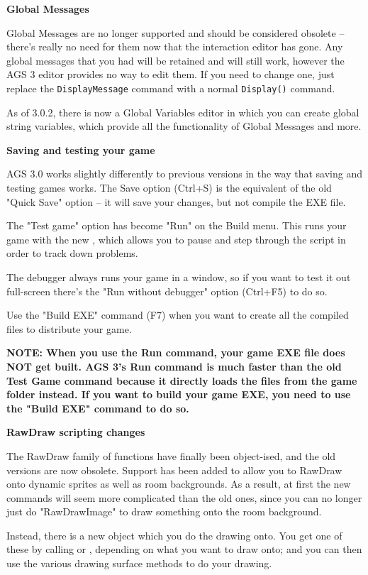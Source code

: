\bf{Global Messages}

Global Messages are no longer supported and should be considered obsolete --
there's really no need for them now that the interaction editor has gone.
Any global messages that you had will be retained and will still work,
however the AGS 3 editor provides no way to edit them. If you need to change
one, just replace the \verb$DisplayMessage$ command with a normal \verb$Display()$
command.

As of 3.0.2, there is now a Global Variables editor in which you can create global
string variables, which provide all the functionality of Global Messages and more.

\bf{Saving and testing your game}

AGS 3.0 works slightly differently to previous versions in the way that saving
and testing games works. The Save option (Ctrl+S) is the equivalent of the old
"Quick Save" option -- it will save your changes, but not compile the EXE file.

The "Test game" option has become "Run" on the Build menu. This runs your game
with the new , which allows you to pause
and step through the script in order to track down problems.

The debugger always runs your game in a window, so if you want to test it out
full-screen there's the "Run without debugger" option (Ctrl+F5) to do so.

Use the "Build EXE" command (F7) when you want to create all the compiled files
to distribute your game.

\bf{NOTE:} When you use the Run command, your game EXE file does \bf{NOT} get built.
AGS 3's Run command is much faster than the old Test Game command because
it directly loads the files from the game folder instead. If you want to
build your game EXE, you need to use the "Build EXE" command to do so.

\bf{RawDraw scripting changes}

The RawDraw family of functions have finally been object-ised, and the old versions
are now obsolete. Support has been added to allow you to RawDraw onto dynamic sprites
as well as room backgrounds. As a result, at first the new commands will seem more
complicated than the old ones, since you can no longer just do "RawDrawImage" to
draw something onto the room background.

Instead, there is a new  object which
you do the drawing onto. You get one of these by calling
 or
,
depending on what you want to draw onto; and you can then use the various drawing surface
methods to do your drawing.

